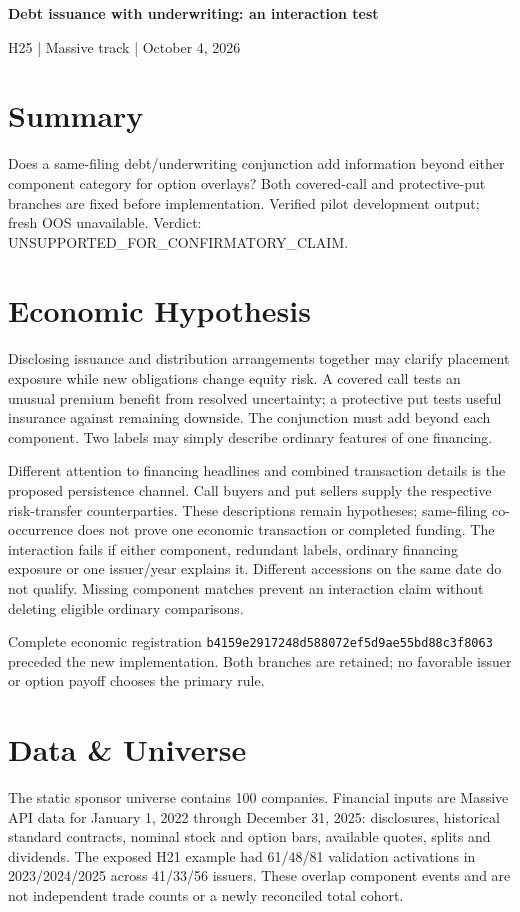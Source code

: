 \documentclass[11pt,letterpaper]{article}
\begin{document}
\begin{center}{\Large\bfseries Debt issuance with underwriting: an interaction test}\par\smallskip H25 | Massive track | October 4, 2026\end{center}
\section{Summary}
Does a same-filing debt/underwriting conjunction add information beyond either component category for option overlays? Both covered-call and protective-put branches are fixed before implementation. Verified pilot development output; fresh OOS unavailable. Verdict: UNSUPPORTED\_FOR\_CONFIRMATORY\_CLAIM.

\section{Economic Hypothesis}
Disclosing issuance and distribution arrangements together may clarify placement exposure while new obligations change equity risk. A covered call tests an unusual premium benefit from resolved uncertainty; a protective put tests useful insurance against remaining downside. The conjunction must add beyond each component. Two labels may simply describe ordinary features of one financing.

Different attention to financing headlines and combined transaction details is the proposed persistence channel. Call buyers and put sellers supply the respective risk-transfer counterparties. These descriptions remain hypotheses; same-filing co-occurrence does not prove one economic transaction or completed funding. The interaction fails if either component, redundant labels, ordinary financing exposure or one issuer/year explains it. Different accessions on the same date do not qualify. Missing component matches prevent an interaction claim without deleting eligible ordinary comparisons.

Complete economic registration \nolinkurl{b4159e2917248d588072ef5d9ae55bd88c3f8063} preceded the new implementation. Both branches are retained; no favorable issuer or option payoff chooses the primary rule.

\section{Data \& Universe}
The static sponsor universe contains 100 companies. Financial inputs are Massive API data for January 1, 2022 through December 31, 2025: disclosures, historical standard contracts, nominal stock and option bars, available quotes, splits and dividends. The exposed H21 example had 61/48/81 validation activations in 2023/2024/2025 across 41/33/56 issuers. These overlap component events and are not independent trade counts or a newly reconciled total cohort.
\end{document}
